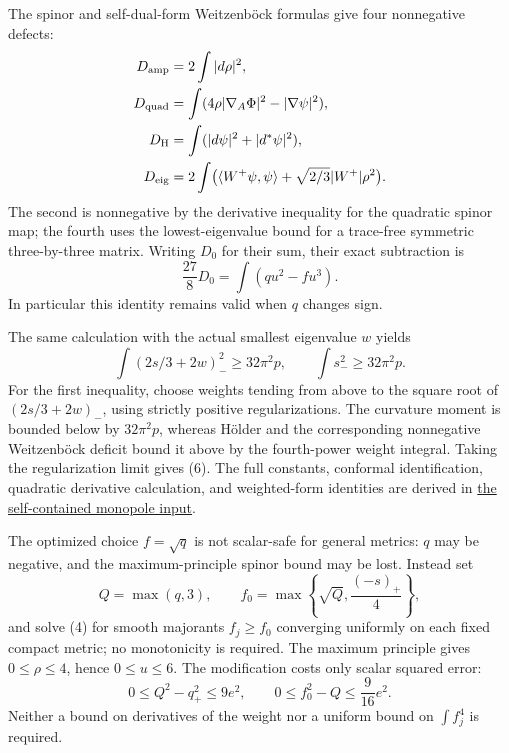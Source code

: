 \documentclass[
  english,
]{article}
\begin{document}
The spinor and self-dual-form Weitzenböck formulas give four nonnegative
defects: \[
 \begin{aligned}
 D_{\rm amp}&=2\int|d\rho|^2,\\
 D_{\rm quad}&=\int(4\rho|\nabla_A\Phi|^2-|\nabla\psi|^2),\\
 D_{\rm H}&=\int(|d\psi|^2+|d^*\psi|^2),\\
 D_{\rm eig}&=2\int\bigl(\langle W^+\psi,\psi\rangle
                        +\sqrt{2/3}|W^+|\rho^2\bigr).
 \end{aligned}
\] The second is nonnegative by the derivative inequality for the
quadratic spinor map; the fourth uses the lowest-eigenvalue bound for a
trace-free symmetric three-by-three matrix. Writing \(D_0\) for their
sum, their exact subtraction is \[
                  \frac{27}{8}D_0=\int(qu^2-fu^3).         \tag{5}
\] In particular this identity remains valid when \(q\) changes sign.

The same calculation with the actual smallest eigenvalue \(w\) yields \[
 \int(2s/3+2w)_-^2\ge32\pi^2p,\qquad
 \int s_-^2\ge32\pi^2p.                                  \tag{6}
\] For the first inequality, choose weights tending from above to the
square root of \((2s/3+2w)_-\), using strictly positive regularizations.
The curvature moment is bounded below by \(32\pi^2p\), whereas Hölder
and the corresponding nonnegative Weitzenböck deficit bound it above by
the fourth-power weight integral. Taking the regularization limit gives
(6). The full constants, conformal identification, quadratic derivative
calculation, and weighted-form identities are derived in
\href{../proofs/round3_monopole_input.md}{the self-contained monopole
input}.

The optimized choice \(f=\sqrt q\) is not scalar-safe for general
metrics: \(q\) may be negative, and the maximum-principle spinor bound
may be lost. Instead set \[
 Q=\max(q,3),\qquad
 f_0=\max\left\{\sqrt Q,\frac{(-s)_+}{4}\right\},
                                                               \tag{7}
\] and solve (4) for smooth majorants \(f_j\ge f_0\) converging
uniformly on each fixed compact metric; no monotonicity is required. The
maximum principle gives \(0\le\rho\le4\), hence \(0\le u\le6\). The
modification costs only scalar squared error: \[
 0\le Q^2-q_+^2\le9e^2,\qquad
 0\le f_0^2-Q\le\frac9{16}e^2.                            \tag{8}
\] Neither a bound on derivatives of the weight nor a uniform bound on
\(\int f_j^4\) is required.
\end{document}
